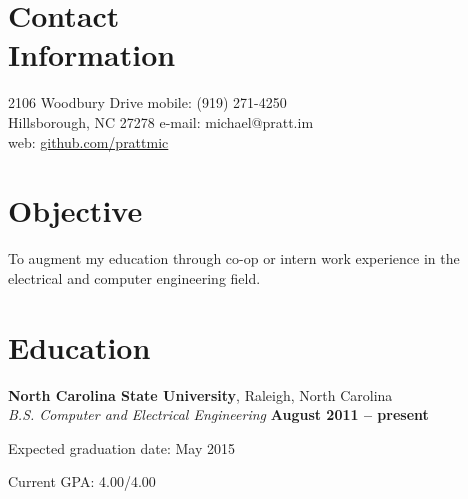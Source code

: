 \documentclass[margin,line,letterpaper]{resume}
\begin{document}
\begin{resume}

    \section{\mysidestyle Contact\\Information}

    2106 Woodbury Drive             \hfill mobile: (919) 271-4250          \vspace{0mm}\\\vspace{0mm}%
    Hillsborough, NC 27278          \hfill e-mail: michael@pratt.im      \vspace{0mm}\\\vspace{0mm}%
                                    \hfill web: \href{http://github.com/prattmic}{github.com/prattmic}      \vspace{0mm}\\\vspace{-4.5mm}%


    \section{\mysidestyle Objective}

    To augment my education through co-op or intern work experience
    in the electrical and computer engineering field.


    \section{\mysidestyle Education}

    \textbf{North Carolina State University}, Raleigh, North Carolina \vspace{2mm}\\\vspace{1mm}%
    \textsl{B.S. Computer and Electrical Engineering} \hfill \textbf{ August 2011 -- present}\vspace{-3mm}\\\vspace{-1mm}%
    \begin{list2}
        \item Expected graduation date: May 2015
        \item Current GPA: 4.00/4.00
    \end{list2}\vspace{-1.5mm}



\end{resume}
\end{document}
